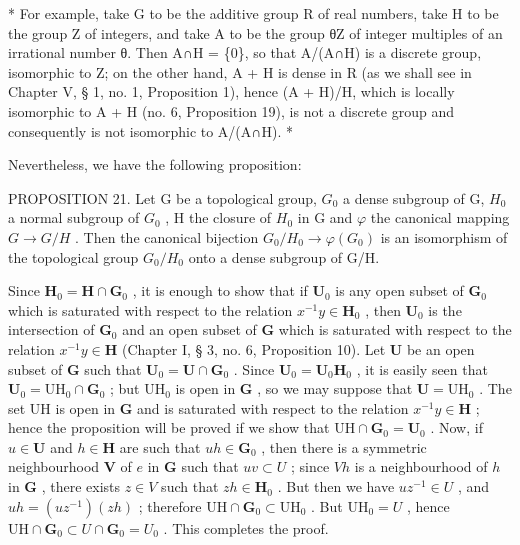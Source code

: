 * For example, take G to be the additive group R of real numbers, take H to be the group Z of integers, and take A to be the group θZ of integer multiples of an irrational number θ. Then A∩H = \{0\}, so that A/(A∩H) is a discrete group, isomorphic to Z; on the other hand, A + H is dense in R (as we shall see in Chapter V, § 1, no. 1, Proposition 1), hence (A + H)/H, which is locally isomorphic to A + H (no. 6, Proposition 19), is not a discrete group and consequently is not isomorphic to A/(A∩H). *

Nevertheless, we have the following proposition:

PROPOSITION 21. Let G be a topological group, \(G_{0}\) a dense subgroup of G, \(H_{0}\) a normal subgroup of \(G_{0}\) , H the closure of \(H_{0}\) in G and \(\varphi\) the canonical mapping \(G \rightarrow G/H\) . Then the canonical bijection \(G_{0}/H_{0} \rightarrow \varphi(G_{0})\) is an isomorphism of the topological group \(G_{0}/H_{0}\) onto a dense subgroup of G/H.

Since \(\mathbf{H}_0 = \mathbf{H} \cap \mathbf{G}_0\) , it is enough to show that if \(\mathbf{U}_0\) is any open subset of \(\mathbf{G}_0\) which is saturated with respect to the relation \(x^{-1}y \in \mathbf{H}_0\) , then \(\mathbf{U}_0\) is the intersection of \(\mathbf{G}_0\) and an open subset of \(\mathbf{G}\) which is saturated with respect to the relation \(x^{-1}y \in \mathbf{H}\) (Chapter I, § 3, no. 6, Proposition 10). Let \(\mathbf{U}\) be an open subset of \(\mathbf{G}\) such that \(\mathbf{U}_0 = \mathbf{U} \cap \mathbf{G}_0\) . Since \(\mathbf{U}_0 = \mathbf{U}_0\mathbf{H}_0\) , it is easily seen that \(\mathbf{U}_0 = \mathrm{UH}_0 \cap \mathbf{G}_0\) ; but \(\mathrm{UH}_0\) is open in \(\mathbf{G}\) , so we may suppose that \(\mathbf{U} = \mathrm{UH}_0\) . The set \(\mathrm{UH}\) is open in \(\mathbf{G}\) and is saturated with respect to the relation \(x^{-1}y \in \mathbf{H}\) ; hence the proposition will be proved if we show that \(\mathrm{UH} \cap \mathbf{G}_0 = \mathbf{U}_0\) . Now, if \(u \in \mathbf{U}\) and \(h \in \mathbf{H}\) are such that \(uh \in \mathbf{G}_0\) , then there is a symmetric neighbourhood \(\mathbf{V}\) of \(e\) in \(\mathbf{G}\) such that \(uv \subset U\) ; since \(Vh\) is a neighbourhood of \(h\) in \(\mathbf{G}\) , there exists \(z \in V\) such that \(zh \in \mathbf{H}_0\) . But then we have \(uz^{-1} \in U\) , and \(uh = (uz^{-1})(zh)\) ; therefore \(\mathrm{UH} \cap \mathbf{G}_0 \subset \mathrm{UH}_0\) . But \(\mathrm{UH}_0 = U\) , hence \(\mathrm{UH} \cap \mathbf{G}_0 \subset U \cap \mathbf{G}_0 = U_0\) . This completes the proof.

